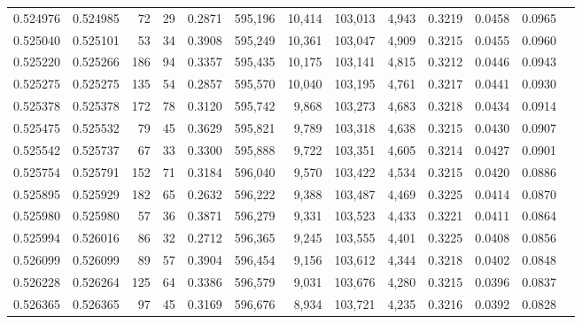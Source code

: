 \begin{tabular}{rrrrrrrrrrrrr}
0.524976 & 0.524985 &    72 &    29 &                                     0.2871 & 595,196 &  10,414 & 103,013 &   4,943 & 0.3219 & 0.0458 & 0.0965 \\
0.525040 & 0.525101 &    53 &    34 &                                     0.3908 & 595,249 &  10,361 & 103,047 &   4,909 & 0.3215 & 0.0455 & 0.0960 \\
0.525220 & 0.525266 &   186 &    94 &                                     0.3357 & 595,435 &  10,175 & 103,141 &   4,815 & 0.3212 & 0.0446 & 0.0943 \\
0.525275 & 0.525275 &   135 &    54 &                                     0.2857 & 595,570 &  10,040 & 103,195 &   4,761 & 0.3217 & 0.0441 & 0.0930 \\
0.525378 & 0.525378 &   172 &    78 &                                     0.3120 & 595,742 &   9,868 & 103,273 &   4,683 & 0.3218 & 0.0434 & 0.0914 \\
0.525475 & 0.525532 &    79 &    45 &                                     0.3629 & 595,821 &   9,789 & 103,318 &   4,638 & 0.3215 & 0.0430 & 0.0907 \\
0.525542 & 0.525737 &    67 &    33 &                                     0.3300 & 595,888 &   9,722 & 103,351 &   4,605 & 0.3214 & 0.0427 & 0.0901 \\
0.525754 & 0.525791 &   152 &    71 &                                     0.3184 & 596,040 &   9,570 & 103,422 &   4,534 & 0.3215 & 0.0420 & 0.0886 \\
0.525895 & 0.525929 &   182 &    65 &                                     0.2632 & 596,222 &   9,388 & 103,487 &   4,469 & 0.3225 & 0.0414 & 0.0870 \\
0.525980 & 0.525980 &    57 &    36 &                                     0.3871 & 596,279 &   9,331 & 103,523 &   4,433 & 0.3221 & 0.0411 & 0.0864 \\
0.525994 & 0.526016 &    86 &    32 &                                     0.2712 & 596,365 &   9,245 & 103,555 &   4,401 & 0.3225 & 0.0408 & 0.0856 \\
0.526099 & 0.526099 &    89 &    57 &                                     0.3904 & 596,454 &   9,156 & 103,612 &   4,344 & 0.3218 & 0.0402 & 0.0848 \\
0.526228 & 0.526264 &   125 &    64 &                                     0.3386 & 596,579 &   9,031 & 103,676 &   4,280 & 0.3215 & 0.0396 & 0.0837 \\
0.526365 & 0.526365 &    97 &    45 &                                     0.3169 & 596,676 &   8,934 & 103,721 &   4,235 & 0.3216 & 0.0392 & 0.0828 \\

\end{tabular}
